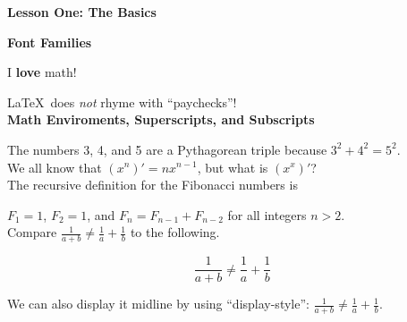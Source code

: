 \documentclass{amsart}
\begin{document}

\begin{center}
	\textbf{Lesson One: The Basics}
\end{center}

\textbf{Font Families}

I \textbf{love} math!

\LaTeX\ does \emph{not} rhyme with ``paychecks''!\\

\textbf{Math Enviroments, Superscripts, and Subscripts}

The numbers 3, 4, and 5 are a Pythagorean triple because $3^2+4^2=5^2$.\\

We all     know      that $(x^n)'=nx^{n-1}$, but what is $(x^x)'$?\\ 

The recursive definition for the Fibonacci numbers is 

$F_1=1$, $F_2=1$, and $F_n=F_{n-1}+F_{n-2}$ for all integers $n>2$.\\

Compare $\frac{1}{a+b}\neq\frac{1}{a}+\frac{1}{b}$ to the following.

$$\frac{1}{a+b}\neq\frac{1}{a}+\frac{1}{b}$$

We can also display it midline by using ``display-style'': 
$\displaystyle\frac{1}{a+b}\neq\frac{1}{a}+\frac{1}{b}$.\\

\end{document}
